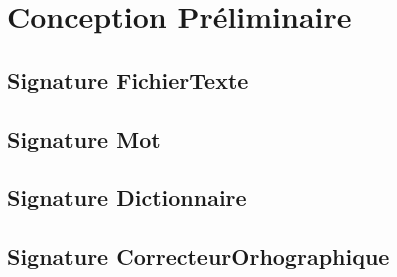 \section{Conception Préliminaire}
	\subsection{Signature FichierTexte}
		
		
	\subsection{Signature Mot}
		
		
	\subsection{Signature Dictionnaire}
		
		
	\subsection{Signature CorrecteurOrhographique}
		
